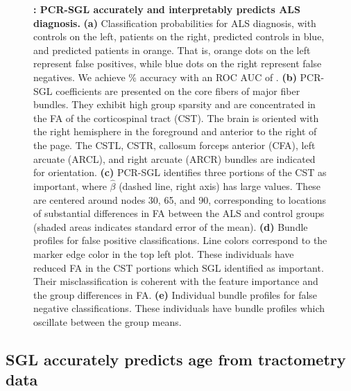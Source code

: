\documentclass[10pt,letterpaper]{article}
\begin{document}
\begin{figure}[b!]
    {\label{fig:class-results:probs}}
    {\label{fig:class-results:coefs3d}}
    {\label{fig:class-results:tract-profiles}}
    {\label{fig:class-results:false-positives}}
    {\label{fig:class-results:false-negatives}}
    \caption{
    {\bf {}: PCR-SGL accurately and interpretably predicts ALS diagnosis.}
    {\bf (a)} Classification probabilities for ALS diagnosis, with
    controls on the left, patients on the right, predicted controls in
    blue, and predicted patients in orange. That is, orange dots on the left
    represent false positives, while blue dots on the right represent
    false negatives. We achieve {\protect\alsAccuracy}\% accuracy with an
    ROC AUC of {\protect\alsRocAuc}.
    {\bf (b)} PCR-SGL coefficients are presented on the core fibers of major
    fiber bundles. They exhibit high group sparsity and are concentrated
    in the FA of the corticospinal tract (CST).
    The brain is oriented with the right hemisphere
    in the foreground and anterior to the right of the page. The CSTL, CSTR,
    callosum forceps anterior (CFA), left arcuate (ARCL), and right arcuate (ARCR)
    bundles are indicated for orientation.
    {\bf (c)} PCR-SGL identifies three portions of the CST as important,
    where $\hat{\beta}$ (dashed line, right axis) has large values. These
    are centered around nodes 30, 65, and 90, corresponding to locations
    of substantial differences in FA between the ALS and control groups
    (shaded areas indicates standard error of the mean).
    {\bf (d)} Bundle profiles for false positive classifications. Line
    colors correspond to the marker edge color in the top left plot.
    These individuals have reduced FA in the CST portions which SGL
    identified as important. Their misclassification is coherent with the
    feature importance and the group differences in FA.
    {\bf (e)} Individual bundle profiles for false negative
    classifications. These individuals have bundle profiles which
    oscillate between the group means.
    \label{fig:class-results}
    }
\end{figure}

\subsection*{SGL accurately predicts age from tractometry data}
\end{document}
